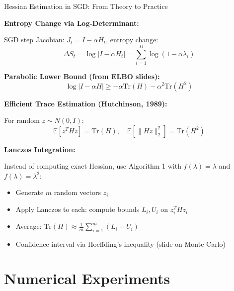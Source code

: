 \documentclass[aspectratio=169, 12pt]{beamer}
\begin{document}
\begin{frame}{Hessian Estimation in SGD: From Theory to Practice}

\textbf{Entropy Change via Log-Determinant:}

SGD step Jacobian: \(J_t = I - \alpha H_t\), entropy change:
\[
\Delta S_t = \log |I - \alpha H_t| = \sum_{i=1}^D \log(1 - \alpha \lambda_i)
\]

\textbf{Parabolic Lower Bound (from ELBO slides):}
\[
\log |I - \alpha H| \geq -\alpha \text{Tr}(H) - \alpha^2 \text{Tr}(H^2)
\]

\vspace{0.2cm}

\textbf{Efficient Trace Estimation (Hutchinson, 1989):}

For random \(z \sim N(0, I)\):
\[
\mathbb{E}[z^T H z] = \text{Tr}(H), \quad \mathbb{E}[\|Hz\|_2^2] = \text{Tr}(H^2)
\]

\vspace{0.2cm}

\textbf{Lanczos Integration:}

Instead of computing exact Hessian, use Algorithm 1 with \(f(\lambda) = \lambda\) and \(f(\lambda) = \lambda^2\):
\begin{itemize}
    \item Generate \(m\) random vectors \(z_i\)
    \item Apply Lanczos to each: compute bounds \(L_i, U_i\) on \(z_i^T H z_i\)
    \item Average: \(\text{Tr}(H) \approx \frac{1}{m}\sum_{i=1}^m (L_i + U_i)\)
    \item Confidence interval via Hoeffding's inequality (slide on Monte Carlo)
\end{itemize}

\end{frame}


\section{Numerical Experiments}
\end{document}
